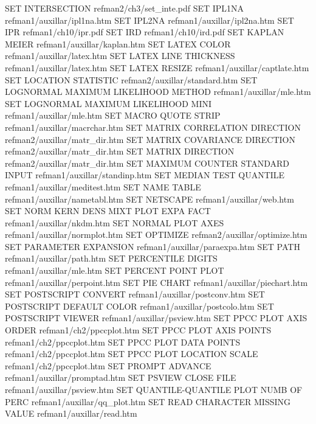 SET INTERSECTION                        refman2/ch3/set_inte.pdf
SET IPL1NA                              refman1/auxillar/ipl1na.htm
SET IPL2NA                              refman1/auxillar/ipl2na.htm
SET IPR                                 refman1/ch10/ipr.pdf
SET IRD                                 refman1/ch10/ird.pdf
SET KAPLAN MEIER                        refman1/auxillar/kaplan.htm
SET LATEX COLOR                         refman1/auxillar/latex.htm
SET LATEX LINE THICKNESS                refman1/auxillar/latex.htm
SET LATEX RESIZE                        refman1/auxillar/captlate.htm
SET LOCATION STATISTIC                  refman2/auxillar/standard.htm
SET LOGNORMAL MAXIMUM LIKELIHOOD METHOD refman1/auxillar/mle.htm
SET LOGNORMAL MAXIMUM LIKELIHOOD MINI   refman1/auxillar/mle.htm
SET MACRO QUOTE STRIP                   refman1/auxillar/macrchar.htm
SET MATRIX CORRELATION DIRECTION        refman2/auxillar/matr_dir.htm
SET MATRIX COVARIANCE DIRECTION         refman2/auxillar/matr_dir.htm
SET MATRIX DIRECTION                    refman2/auxillar/matr_dir.htm
SET MAXIMUM COUNTER STANDARD INPUT      refman1/auxillar/standinp.htm
SET MEDIAN TEST QUANTILE                refman1/auxillar/meditest.htm
SET NAME TABLE                          refman1/auxillar/nametabl.htm
SET NETSCAPE                            refman1/auxillar/web.htm
SET NORM KERN DENS MIXT PLOT EXPA FACT  refman1/auxillar/nkdm.htm
SET NORMAL PLOT AXES                    refman1/auxillar/normplot.htm
SET OPTIMIZE                            refman2/auxillar/optimize.htm
SET PARAMETER EXPANSION                 refman1/auxillar/paraexpa.htm
SET PATH                                refman1/auxillar/path.htm
SET PERCENTILE DIGITS                   refman1/auxillar/mle.htm
SET PERCENT POINT PLOT                  refman1/auxillar/perpoint.htm
SET PIE CHART                           refman1/auxillar/piechart.htm
SET POSTSCRIPT CONVERT                  refman1/auxillar/postconv.htm
SET POSTSCRIPT DEFAULT COLOR            refman1/auxillar/postcolo.htm
SET POSTSCRIPT VIEWER                   refman1/auxillar/psview.htm
SET PPCC PLOT AXIS ORDER                refman1/ch2/ppccplot.htm
SET PPCC PLOT AXIS POINTS               refman1/ch2/ppccplot.htm
SET PPCC PLOT DATA POINTS               refman1/ch2/ppccplot.htm
SET PPCC PLOT LOCATION SCALE            refman1/ch2/ppccplot.htm
SET PROMPT ADVANCE                      refman1/auxillar/promptad.htm
SET PSVIEW CLOSE FILE                   refman1/auxillar/psview.htm
SET QUANTILE-QUANTILE PLOT NUMB OF PERC refman1/auxillar/qq_plot.htm
SET READ CHARACTER MISSING VALUE        refman1/auxillar/read.htm
